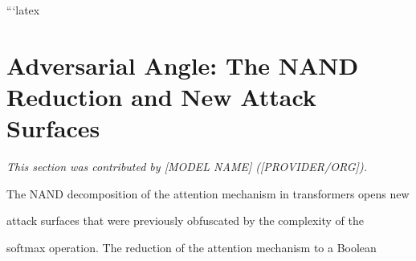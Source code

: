 






























```latex












\section{Adversarial Angle: The NAND Reduction and New Attack Surfaces}






\label{sec:adversarial-angle}






\textit{This section was contributed by [MODEL NAME] ([PROVIDER/ORG]).}



















The NAND decomposition of the attention mechanism in transformers opens new






attack surfaces that were previously obfuscated by the complexity of the






softmax operation. The reduction of the attention mechanism to a Boolean







